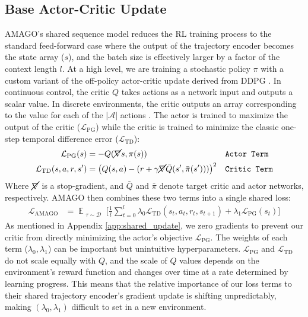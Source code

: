 \documentclass{article}
\begin{document}
\subsection{Base Actor-Critic Update}
\label{app:actor-critic}
AMAGO's shared sequence model reduces the RL training process to the standard feed-forward case where the output of the trajectory encoder becomes the state array ($s$), and the batch size is effectively larger by a factor of the context length $l$. At a high level, we are training a stochastic policy $\pi$ with a custom variant of the off-policy actor-critic update derived from DDPG \cite{lillicrap2015continuous}. In continuous control, the critic $Q$ takes actions as a network input and outputs a scalar value. In discrete environments, the critic outputs an array corresponding to the value for each of the $\mathcal{|A|}$ actions \cite{christodoulou2019soft}. The actor is trained to maximize the output of the critic ($\mathcal{L}_{\text{PG}}$) while the critic is trained to minimize the classic one-step temporal difference error ($\mathcal{L}_{\text{TD}}$):
\begin{align}
\label{eq:actor_loss}
    \mathcal{L}_{\text{PG}}(s) &= -Q(\cancel{\nabla} s, \pi(s)) && \text{\texttt{Actor Term}}\\
    \mathcal{L}_{\text{TD}}(s, a, r, s') &= \big(Q(s, a) - (r + \gamma \cancel{\nabla}\bar{Q}(s', \bar{\pi}(s')))\big)^2 && \text{\texttt{Critic Term}}
\end{align}
Where $\cancel{\nabla}$ is a stop-gradient, and $\bar{Q}$ and $\bar{\pi}$ denote target critic and actor networks, respectively. AMAGO then combines these two terms into a single shared loss:
\begin{align}
\displaystyle \mathcal{L}_{\text{AMAGO}}&= \mathop{\mathbb{E}}_{\substack{\tau \sim \mathcal{D}}}\bigg[\frac{1}{l} \sum_{t=0}^{l} \lambda_0 \mathcal{L}_{\text{TD}}(s_t, a_t, r_t, s_{t+1}) + \lambda_1 \mathcal{L}_{\text{PG}}(s_t)\bigg]
\label{eq:loss}
\end{align}
As mentioned in Appendix \ref{app:shared_update}, we zero gradients to prevent our critic from directly minimizing the actor's objective $\mathcal{L}_{\text{PG}}$. The weights of each term ($\lambda_0, \lambda_1$) can be important but unintuitive hyperparameters. $\mathcal{L}_{\text{PG}}$ and $\mathcal{L}_{\text{TD}}$ do not scale equally with $Q$, and the scale of $Q$ values depends on the environment's reward function and changes over time at a rate determined by learning progress. This means that the relative importance of our loss terms to their shared trajectory encoder's gradient update is shifting unpredictably, making $(\lambda_0, \lambda_1)$ difficult to set in a new environment.
\end{document}

